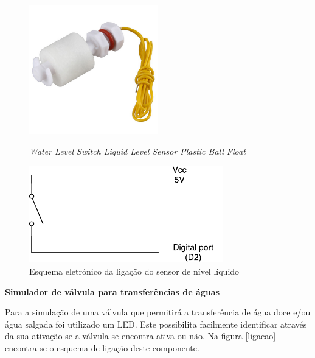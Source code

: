 \begin{figure}[h]
	\centering
	\begin{minipage}[b]{0.49\textwidth}
		\centering
		\includegraphics[width=0.5\textwidth]{img/hardware/liquido.JPG}
		\caption{\textit{Water Level Switch Liquid Level Sensor Plastic Ball Float}}
		\label{levelimg}
	\end{minipage}
	\hfill
	\begin{minipage}[b]{0.49\textwidth}
		\centering
		\includegraphics[width=0.75\textwidth]{img/hardware/sw_esquema.pdf}
		\caption{Esquema eletrónico da ligação do sensor de nível líquido}
		\label{esquem-liquido}
	\end{minipage}
\end{figure}

\textbf{Simulador de válvula para transferências de águas}

Para a simulação de uma válvula que permitirá a transferência de água doce e/ou água salgada foi utilizado um \ac{LED}. Este possibilita facilmente identificar através da sua ativação se a válvula se encontra ativa ou não. Na figura \ref{ligacao} encontra-se o esquema de ligação deste componente. 


